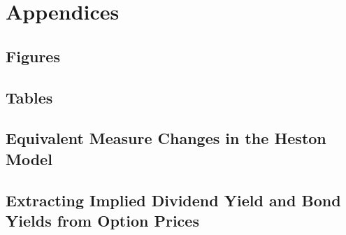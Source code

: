 
\renewcommand{\thesection}{}
\section*{Appendices}
\listoftables
\listoffigures
\restoregeometry
\setcounter{figure}{0}
\renewcommand{\thefigure}{A\arabic{figure}}
\setcounter{table}{0}
\renewcommand{\thetable}{A\arabic{table}}
\clearpage

\renewcommand\thesubsection{A}
\subsection{Figures}
%
%
%
%
%
%
%
%
%
%
\clearpage

\renewcommand\thesubsection{B}
\subsection{Tables}
%
%
%
%
%
%
%
%
%
%
\clearpage


\renewcommand\thesubsection{B}
\subsection{Equivalent Measure Changes in the Heston Model}
% 
\clearpage

\renewcommand\thesubsection{C}
\subsection{Extracting Implied Dividend Yield and Bond Yields from Option Prices}
% 
\clearpage

